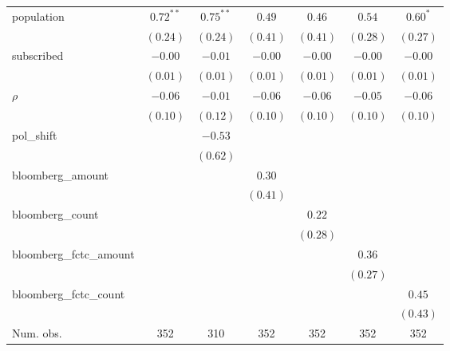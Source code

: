 \begin{table}[!h]
\begin{center}
\begin{tabular}{l c c c c c c }
population              & $0.72^{**}$  & $0.75^{**}$  & $0.49$       & $0.46$       & $0.54$       & $0.60^{*}$   \\
                        & $(0.24)$     & $(0.24)$     & $(0.41)$     & $(0.41)$     & $(0.28)$     & $(0.27)$     \\
subscribed              & $-0.00$      & $-0.01$      & $-0.00$      & $-0.00$      & $-0.00$      & $-0.00$      \\
                        & $(0.01)$     & $(0.01)$     & $(0.01)$     & $(0.01)$     & $(0.01)$     & $(0.01)$     \\
$\rho$                  & $-0.06$      & $-0.01$      & $-0.06$      & $-0.06$      & $-0.05$      & $-0.06$      \\
                        & $(0.10)$     & $(0.12)$     & $(0.10)$     & $(0.10)$     & $(0.10)$     & $(0.10)$     \\
pol\_shift              &              & $-0.53$      &              &              &              &              \\
                        &              & $(0.62)$     &              &              &              &              \\
bloomberg\_amount       &              &              & $0.30$       &              &              &              \\
                        &              &              & $(0.41)$     &              &              &              \\
bloomberg\_count        &              &              &              & $0.22$       &              &              \\
                        &              &              &              & $(0.28)$     &              &              \\
bloomberg\_fctc\_amount &              &              &              &              & $0.36$       &              \\
                        &              &              &              &              & $(0.27)$     &              \\
bloomberg\_fctc\_count  &              &              &              &              &              & $0.45$       \\
                        &              &              &              &              &              & $(0.43)$     \\
\midrule
Num. obs.               & 352          & 310          & 352          & 352          & 352          & 352          \\

\end{tabular}
\end{center}
\end{table}
